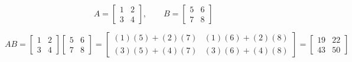 \documentclass{article}
\begin{document}
\[
A = \begin{bmatrix}
    1 & 2 \\
    3 & 4
\end{bmatrix},
\qquad
B = \begin{bmatrix}
    5 & 6 \\
    7 & 8
\end{bmatrix}
\]

\[
AB = \begin{bmatrix}
    1 & 2 \\
    3 & 4
\end{bmatrix}
\begin{bmatrix}
    5 & 6 \\
    7 & 8
\end{bmatrix}
= \begin{bmatrix}
    (1)(5)+(2)(7) & (1)(6)+(2)(8) \\
    (3)(5)+(4)(7) & (3)(6)+(4)(8)
\end{bmatrix}
= \begin{bmatrix}
    19 & 22 \\
    43 & 50
\end{bmatrix}
\]
\end{document}

